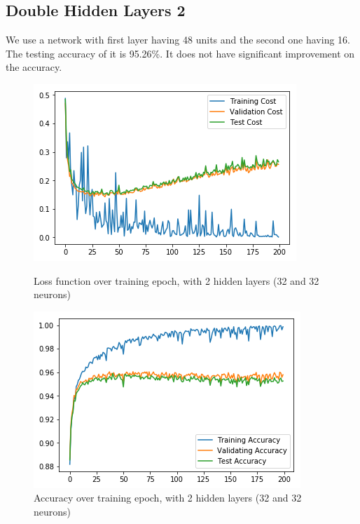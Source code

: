 \documentclass{article}
\begin{document}
\subsection{Double Hidden Layers 2}
We use a network with first layer having 48 units and the second one having 16. The testing accuracy of it is 95.26\%. It does not have significant improvement on the accuracy.
\begin{figure}[h]
	\begin{minipage}{0.48\textwidth}
		\centering
		\includegraphics[width=\textwidth]{pics/loss_double_32_32.png}
		\caption{Loss function over training epoch, with 2 hidden layers (32 and 32 neurons)}
	\end{minipage}\hfill
	\begin{minipage}{0.48\textwidth}
		\centering
		\includegraphics[width=\textwidth]{pics/acc_double_32_32.png}
		\caption{Accuracy over training epoch, with 2 hidden layers (32 and 32 neurons)}
	\end{minipage}
\end{figure}
\end{document}
